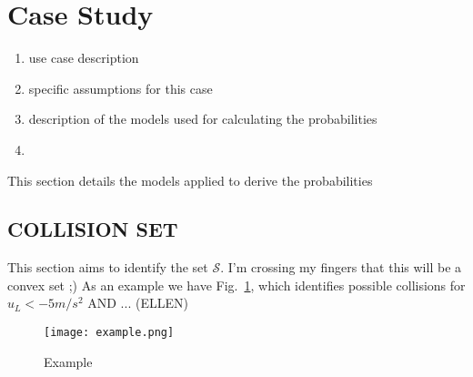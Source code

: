 \section{Case Study} %
\label{sec:example}

\begin{enumerate}
	\item use case description
	\item specific assumptions for this case
	\item description of the models used for calculating the probabilities 
	\item 
\end{enumerate}


This section details the models applied to derive the probabilities
\subsection{COLLISION SET}
This section aims to identify the set $\mathcal{S}$. I'm crossing my fingers that this will be a convex set ;)
As an example we have Fig.~\ref{fig:example}, which identifies possible collisions for $u_L<-5 m/s^2$ AND ...
(ELLEN)
\begin{figure}
  \centering
  \texttt{[image: example.png]}
  \caption{Example }\label{fig:example}
\end{figure}
